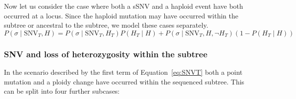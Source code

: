 \documentclass[../../main.tex]{subfiles}
\begin{document}
Now let us consider the case where both a sSNV and a haploid event have both occurred at a locus. Since the haploid mutation may have occurred within the subtree or ancestral to the subtree, we model these cases separately.
\begin{equation}
P(\sigma\mid\text{SNV}_T,H) = P(\sigma\mid\text{SNV}_T,H_T)P(H_T\mid H) + P(\sigma\mid\text{SNV}_T,H,\neg H_T)(1-P(H_T\mid H)) \label{eq:SNVT}
\end{equation}
\subsubsection*{SNV and loss of heterozygosity within the subtree}
In the scenario described by the first term of Equation~\eqref{eq:SNVT} both a point mutation and a ploidy change have occurred within the sequenced subtree.
This can be split into four further subcases:
\end{document}
